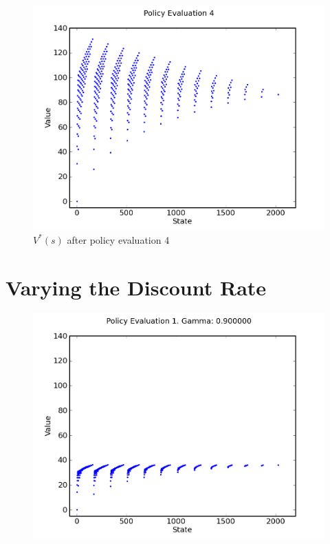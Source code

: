 \documentclass[a4paper]{article}
\begin{document}
\begin{figure}[h]
\center
\includegraphics[scale=0.75]{policy_iteration/evaluation_4.png}
\caption{$V^*(s)$ after policy evaluation 4}
\end{figure}

\newpage

\section{Varying the Discount Rate}
\begin{figure}[h]
\center
\includegraphics[scale=0.75]{gamma_iteration/gamma_9_1}
\end{figure}
\end{document}
